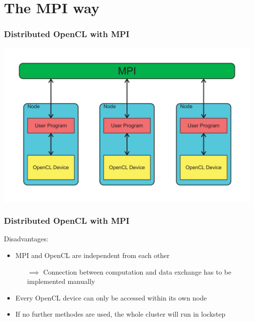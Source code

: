 \documentclass{beamer}
\begin{document}
\section{The MPI way}

\begin{frame}
    \frametitle{Distributed OpenCL with MPI}
    \includegraphics[width=\textwidth]{../2014-09-25_gputalk/mpi_opencl.pdf}
\end{frame}

\begin{frame}
    \frametitle{Distributed OpenCL with MPI}
    Disadvantages:
    \begin{itemize}
        \item MPI and OpenCL are independent from each other
        \begin{itemize}
            \item[$\implies$] Connection between computation and data exchange
                              has to be implemented manually
        \end{itemize}
        \item Every OpenCL device can only be accessed within its own node
        \item If no further methodes are used, the whole cluster will run in lockstep
    \end{itemize}
\end{frame}
\end{document}
